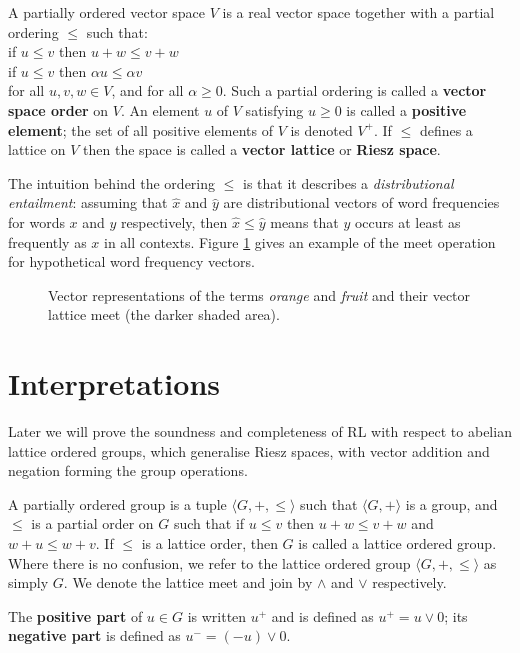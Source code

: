\documentclass[preprint,leqno]{elsarticle}
\begin{document}
\begin{definition}
A partially ordered vector space $V$ is a real vector space together with a partial ordering $\le$ such that:
\vspace{0.1cm}\\
\indent if $u \le v$ then $u + w \le v + w$\\
\indent if $u \le v$ then $\alpha u \le \alpha v$
\vspace{0.1cm}\\
for all $u,v,w \in V$, and for all $\alpha \ge 0$. Such a partial ordering is called a \textbf{vector space order} on $V$. An element $u$ of $V$ satisfying $u \ge 0$ is called a \textbf{positive element}; the set of all positive elements of $V$ is denoted $V^+$. If $\le$ defines a lattice on $V$ then the space is called a \textbf{vector lattice} or \textbf{Riesz space}.
\end{definition}

The intuition behind the ordering $\le$ is that it describes a
\emph{distributional entailment}: assuming that $\hat{x}$ and
$\hat{y}$ are distributional vectors of word frequencies for words $x$
and $y$ respectively, then $\hat{x} \le \hat{y}$ means that $y$ occurs
at least as frequently as $x$ in all contexts. Figure
\ref{fig:orangefruit} gives an example of the meet operation for
hypothetical word frequency vectors.

\begin{figure}
\begin{center}

\caption{Vector representations of the terms \emph{orange} and
  \emph{fruit} and their vector lattice meet (the darker shaded
  area).}
\label{fig:orangefruit}
\end{center}
\end{figure}


\section{Interpretations}

Later we will prove the soundness and completeness of RL with respect
to abelian lattice ordered groups, which generalise Riesz spaces, with
vector addition and negation forming the group operations.

\begin{definition}
  A partially ordered group is a tuple $\langle G, +, \le\rangle$ such
  that $\langle G, +\rangle$ is a group, and $\le$ is a partial order
  on $G$ such that if $u \le v$ then $u + w \le v + w$ and $w + u \le
  w + v$. If $\le$ is a lattice order, then $G$ is called a lattice
  ordered group. Where there is no confusion, we refer to the lattice
  ordered group $\langle G, +, \le\rangle$ as simply $G$. We denote
  the lattice meet and join by $\land$ and $\lor$ respectively.

  The \textbf{positive part} of $u\in G$ is written $u^+$ and is defined
  as $u^+ = u\lor 0$; its \textbf{negative part} is defined as $u^- =
  (-u)\lor 0$.
\end{definition}
\end{document}

